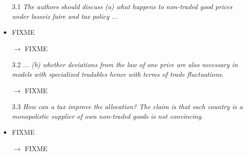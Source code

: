\begin{itemize}
\item[3.1] \textit{The authors should discuss (a) what happens to
    non-traded good prices under lasseiz faire and tax policy ...}

\item FIXME

\item[$\rightarrow $] FIXME

\item[3.2] \textit{... (b) whether deviations from the law of one
    price are also necessary in models with specialized tradables
    hence with terms of trade fluctuations.}

\item[$\rightarrow $] FIXME

\item[3.3] \textit{How can a tax improve the allocation? The claim is
    that each country is a monopolistic supplier of own non-traded
    goods is not convincing.}

\item FIXME

\item[$\rightarrow $] FIXME

\end{itemize}

\newpage

 
